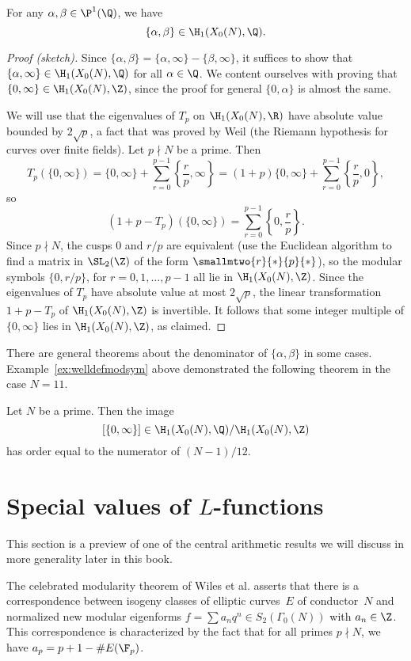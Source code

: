 \documentclass{report}
\begin{document}
\begin{theorem}[Manin]\label{thm:maninrat}
For any $\alpha,\beta\in\P^1(\Q)$, we have
\[\{\alpha,\beta\}\in\H_1(X_0(N),\Q).\]
\end{theorem}
\begin{proof}[Proof (sketch)]
Since $\{\alpha,\beta\} = \{\alpha,\infty\}-\{\beta,\infty\}$, it
suffices to show that $\{\alpha,\infty\}\in\H_1(X_0(N),\Q)$ for
all $\alpha\in\Q$. We content ourselves with proving that
$\{0,\infty\}\in\H_1(X_0(N),\Z)$, since the proof for general
$\{0,\alpha\}$ is almost the same.

We will use that the eigenvalues of $T_p$ on $\H_1(X_0(N),\R)$
have absolute value bounded by $2\sqrt{p}$, a fact that was proved
by Weil (the Riemann hypothesis for curves over finite fields).
Let $p\nmid N$ be a prime. Then
\[
  T_p(\{0,\infty\}) = \{0,\infty\} + \sum_{r=0}^{p-1} \left\{\frac{r}{p},\infty\right\}
    = (1+p)\{0,\infty\} + \sum_{r=0}^{p-1} \left\{\frac{r}{p},0\right\},
\]
so
\[
  (1+p-T_p)(\{0,\infty\}) = \sum_{r=0}^{p-1} \left\{ 0, \frac{r}{p}\right\}.
\]
Since $p\nmid N$, the cusps $0$ and $r/p$ are equivalent (use the Euclidean
algorithm to find a matrix in $\SL_2(\Z)$ of the form $\smallmtwo{r}{*}{p}{*}$), so
the modular symbols $\{0,r/p\}$, for $r=0,1,\ldots,p-1$ all lie in $\H_1(X_0(N),\Z)$.
Since the eigenvalues of $T_p$ have absolute value at most $2\sqrt{p}$, the
linear transformation $1+p-T_p$ of $\H_1(X_0(N),\Z)$ is invertible.
It follows that some integer multiple of $\{0,\infty\}$ lies
in $\H_1(X_0(N),\Z)$, as claimed.
\end{proof}


There are general theorems about the denominator of
$\{\alpha,\beta\}$ in some cases.  Example~\ref{ex:welldefmodsym}
above demonstrated the following theorem in the case $N=11$.
\begin{theorem}
Let $N$ be a prime.  Then the image
$$[\{0,\infty\}] \in \H_1(X_0(N),\Q)/\H_1(X_0(N),\Z)$$ has order equal to the
numerator of $(N-1)/12$.
\end{theorem}

\section{Special values of $L$-functions}
This section is a preview of one of the central arithmetic results we
will discuss in more generality later in this book.

The celebrated modularity theorem of Wiles et al. asserts that
there is a correspondence between isogeny classes of elliptic
curves~$E$ of conductor~$N$ and normalized new modular eigenforms
$f=\sum a_n q^n\in S_2(\Gamma_0(N))$ with $a_n\in\Z$. This
correspondence is characterized by the fact that for all primes
$p\nmid N$, we have $a_p = p+1-\#E(\F_p)$.
\end{document}

